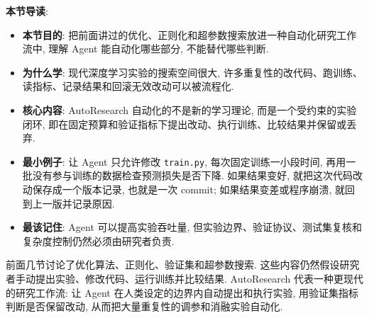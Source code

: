 \documentclass{../nndlcourse}
\begin{document}
\textbf{本节导读}:
\begin{itemize}
  \item \textbf{本节目的}: 把前面讲过的优化、正则化和超参数搜索放进一种自动化研究工作流中, 理解 Agent 能自动化哪些部分, 不能替代哪些判断.
  \item \textbf{为什么学}: 现代深度学习实验的搜索空间很大, 许多重复性的改代码、跑训练、读指标、记录结果和回滚无效改动可以被流程化.
  \item \textbf{核心内容}: AutoResearch 自动化的不是新的学习理论, 而是一个受约束的实验闭环, 即在固定预算和验证指标下提出改动、执行训练、比较结果并保留或丢弃.
  \item \textbf{最小例子}: 让 Agent 只允许修改 \texttt{train.py}, 每次固定训练一小段时间, 再用一批没有参与训练的数据检查预测损失是否下降. 如果结果变好, 就把这次代码改动保存成一个版本记录, 也就是一次 commit; 如果结果变差或程序崩溃, 就回到上一版并记录原因.
  \item \textbf{最该记住}: Agent 可以提高实验吞吐量, 但实验边界、验证协议、测试集复核和复杂度控制仍然必须由研究者负责.
\end{itemize}

前面几节讨论了优化算法、正则化、验证集和超参数搜索. 这些内容仍然假设研究者手动提出实验、修改代码、运行训练并比较结果. AutoResearch 代表一种更现代的研究工作流: 让 Agent 在人类设定的边界内自动提出和执行实验, 用验证集指标判断是否保留改动, 从而把大量重复性的调参和消融实验自动化.
\end{document}
